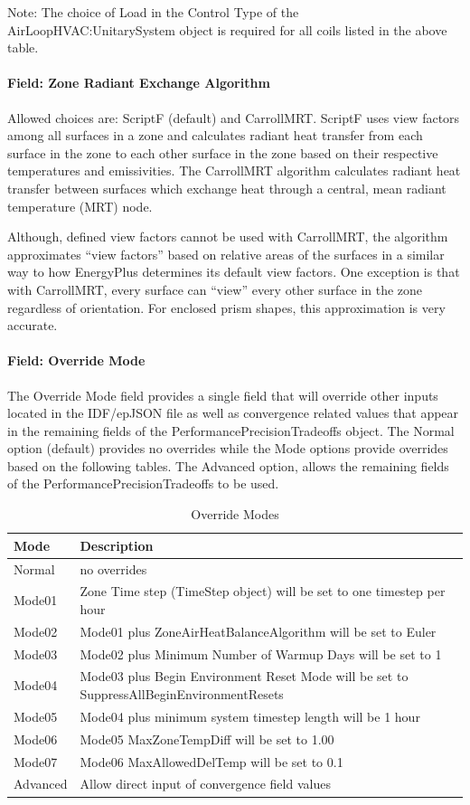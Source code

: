 Note: The choice of Load in the Control Type of the AirLoopHVAC:UnitarySystem object is required for all coils listed in the above table.

\paragraph{Field: Zone Radiant Exchange Algorithm}\label{zone-radiant-exchange-algorithm}

Allowed choices are: ScriptF (default) and CarrollMRT. ScriptF uses view factors among all surfaces in a zone and calculates radiant heat transfer from each surface in the zone to each other surface in the zone based on their respective temperatures and emissivities. The CarrollMRT algorithm calculates radiant heat transfer between surfaces which exchange heat through a central, mean radiant temperature (MRT) node.

Although, defined view factors cannot be used with CarrollMRT, the algorithm approximates ``view factors'' based on relative areas of the surfaces in a similar way to how EnergyPlus determines its default view factors. One exception is that with CarrollMRT, every surface can ``view'' every other surface in the zone regardless of orientation. For enclosed prism shapes, this approximation is very accurate.

\paragraph{Field: Override Mode}\label{override-mode}

The Override Mode field provides a single field that will override other inputs located in the IDF/epJSON file as well as convergence related values that appear in the remaining fields of the PerformancePrecisionTradeoffs object. The Normal option (default) provides no overrides while the Mode options provide overrides based on the following tables. The Advanced option, allows the remaining fields of the PerformancePrecisionTradeoffs to be used. 

\begin{longtable}[c]{p{1.5in}p{5.0in}}
\caption{Override Modes\label{table:override_modes}} \tabularnewline
\toprule
Mode & Description \tabularnewline
\midrule
\endfirsthead

Normal & no overrides\tabularnewline
Mode01 & Zone Time step (TimeStep object) will be set to one timestep per hour\tabularnewline
Mode02 & Mode01 plus ZoneAirHeatBalanceAlgorithm will be set to Euler\tabularnewline
Mode03 & Mode02 plus Minimum Number of Warmup Days will be set to 1\tabularnewline
Mode04 & Mode03 plus Begin Environment Reset Mode will be set to SuppressAllBeginEnvironmentResets\tabularnewline
Mode05 & Mode04 plus minimum system timestep length will be 1 hour\tabularnewline
Mode06 & Mode05 MaxZoneTempDiff will be set to 1.00\tabularnewline
Mode07 & Mode06 MaxAllowedDelTemp will be set to 0.1\tabularnewline
Advanced& Allow direct input of convergence field values\tabularnewline

\bottomrule
\end{longtable}

